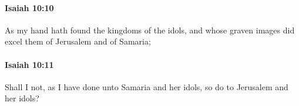 		\paragraph{Isaiah 10:10} %
			\label{ISAIAH-10-10}

			As my hand hath found the kingdoms of the idols, and whose graven images did excel them of Jerusalem and of Samaria;


		\paragraph{Isaiah 10:11} %
			\label{ISAIAH-10-11}

			Shall I not, as I have done unto Samaria and her idols, so do to Jerusalem and her idols?


